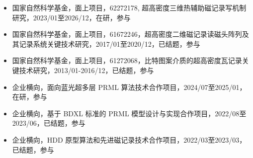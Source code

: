 \documentclass[zh]{resume}
\begin{document}
\begin{itemize}
  \item 国家自然科学基金，面上项目，62272178, 超高密度三维热辅助磁记录写机制研究，2023/01至2026/12，在研，参与
  \item 国家自然科学基金，面上项目，61672246，超高密度二维磁记录读磁头阵列及其记录系统关键技术研究，2017/01至2020/12，已结题，参与
  \item 国家自然科学基金，面上项目，61272068，比特图案介质的超高密度瓦记录关键技术研究，2013/01-2016/12，已结题，参与
  \item 企业横向，面向蓝光超多层 PRML 算法技术合作项目，2024/07至2025/01，在研，参与
  \item 企业横向，基于 BDXL 标准的 PRML 模型设计与实现合作项目，2022/08至2023/06，已结题，参与
  \item 企业横向，HDD 原型算法和先进磁记录技术合作项目，2022/03至2023/03，已结题，参与
\end{itemize}



{\onehalfspacing\hspace{2em}%
\nocite{*}

\par}
\end{document}
